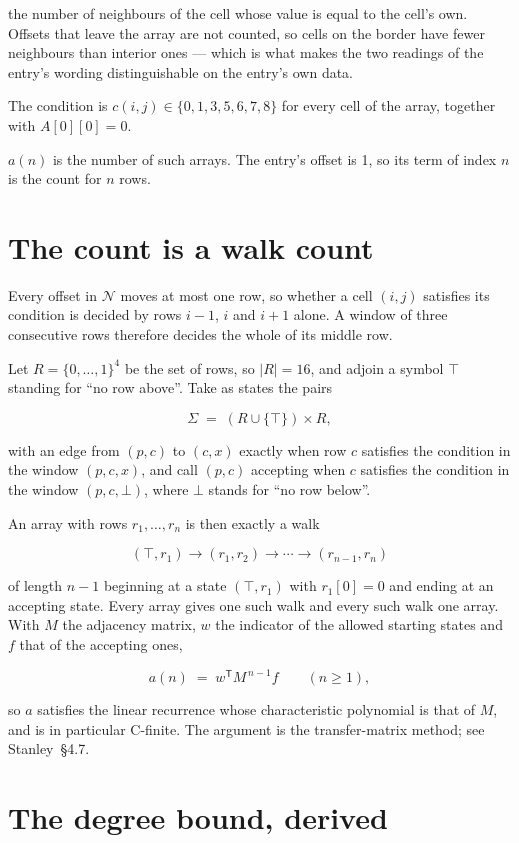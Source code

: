 \documentclass[11pt]{article}
\theoremstyle{definition}
\begin{document}
the number of neighbours of the cell whose value is equal to the cell's own. Offsets that leave the array are not counted, so cells on the border have fewer neighbours than interior ones --- which is what makes the two readings of the entry's wording distinguishable on the entry's own data.

The condition is $c(i,j) \in \{0, 1, 3, 5, 6, 7, 8\}$ for every cell of the array, together with $A[0][0]=0$.

$a(n)$ is the number of such arrays. The entry's offset is 1, so its term of index $n$ is the count for $n$ rows.

\section{The count is a walk count}

Every offset in $\mathcal{N}$ moves at most one row, so whether a cell $(i,j)$ satisfies its condition is decided by rows $i-1$, $i$ and $i+1$ alone. A window of three consecutive rows therefore decides the whole of its middle row.

Let $R = \{0,\dots,1\}^{4}$ be the set of rows, so $|R| = 16$, and adjoin a symbol $\top$ standing for ``no row above''. Take as states the pairs

\[\Sigma \;=\; (R \cup \{\top\}) \times R,\]

with an edge from $(p,c)$ to $(c,x)$ exactly when row $c$ satisfies the condition in the window $(p,c,x)$, and call $(p,c)$ accepting when $c$ satisfies the condition in the window $(p,c,\bot)$, where $\bot$ stands for ``no row below''.

An array with rows $r_1,\dots,r_n$ is then exactly a walk

\[(\top,r_1) \to (r_1,r_2) \to \cdots \to (r_{n-1},r_n)\]

of length $n-1$ beginning at a state $(\top,r_1)$ with $r_1[0]=0$ and ending at an accepting state. Every array gives one such walk and every such walk one array. With $M$ the adjacency matrix, $w$ the indicator of the allowed starting states and $f$ that of the accepting ones,

\[a(n) \;=\; w^{\mathsf T} M^{\,n-1} f \qquad (n \ge 1),\]

so $a$ satisfies the linear recurrence whose characteristic polynomial is that of $M$, and is in particular C-finite. The argument is the transfer-matrix method; see Stanley~\S4.7.

\section{The degree bound, derived}
\end{document}
